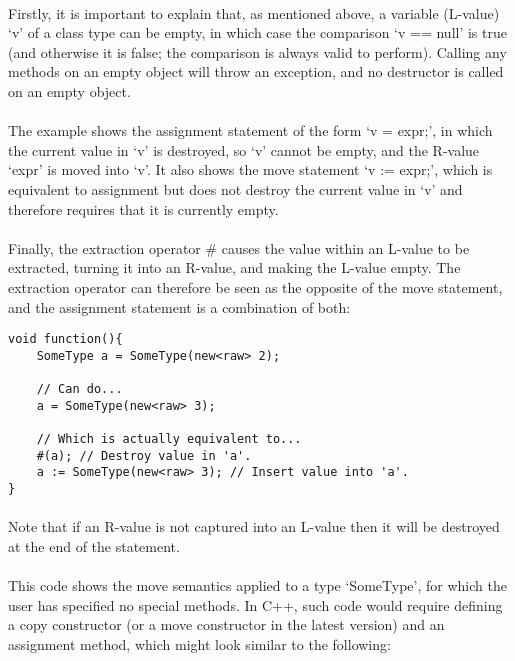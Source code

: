 \documentclass[12pt,twoside,notitlepage]{report}
\begin{document}
\paragraph{}
Firstly, it is important to explain that, as mentioned above, a variable (L-value) `v' of a class type can be empty, in which case the comparison `v == null' is true (and otherwise it is false; the comparison is always valid to perform). Calling any methods on an empty object will throw an exception, and no destructor is called on an empty object.

\paragraph{}
The example shows the assignment statement of the form `v = expr;', in which the current value in `v' is destroyed, so `v' cannot be empty, and the R-value `expr' is moved into `v'. It also shows the move statement `v := expr;', which is equivalent to assignment but does not destroy the current value in `v' and therefore requires that it is currently empty.

\paragraph{}
Finally, the extraction operator \# causes the value within an L-value to be extracted, turning it into an R-value, and making the L-value empty. The extraction operator can therefore be seen as the opposite of the move statement, and the assignment statement is a combination of both:


\begin{lstlisting}
void function(){
	SomeType a = SomeType(new<raw> 2);
	
	// Can do...
	a = SomeType(new<raw> 3);
	
	// Which is actually equivalent to...
	#(a); // Destroy value in 'a'.
	a := SomeType(new<raw> 3); // Insert value into 'a'.
}
\end{lstlisting}


\paragraph{}
Note that if an R-value is not captured into an L-value then it will be destroyed at the end of the statement.

\paragraph{}
This code shows the move semantics applied to a type `SomeType', for which the user has specified no special methods. In C++, such code would require defining a copy constructor (or a move constructor in the latest version) and an assignment method, which might look similar to the following:
\end{document}
